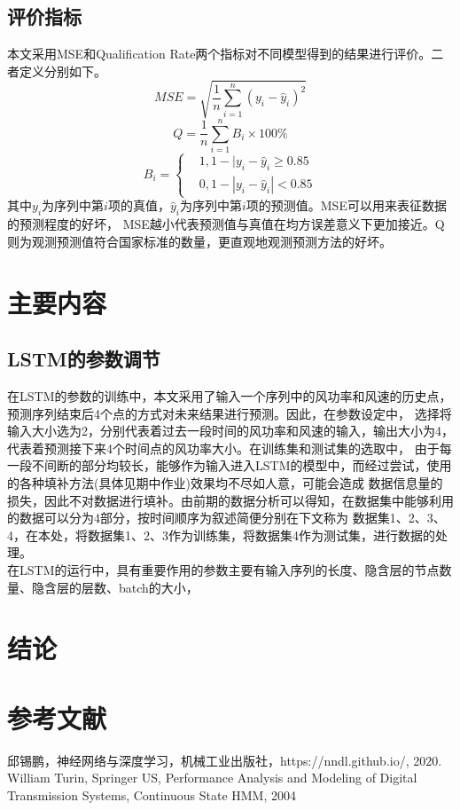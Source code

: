 \documentclass{ctexart}
\begin{document}
\subsection{评价指标}
本文采用MSE和Qualification Rate两个指标对不同模型得到的结果进行评价。二者定义分别如下。\\
\begin{equation}
    MSE = \sqrt{\frac{1}{n}\sum_{i=1}^n (y_i-\hat{y}_i)^2}
\end{equation}
\begin{equation}
    Q = \frac{1}{n}\sum_{i=1}^n B_i\times 100\%
\end{equation}
\begin{equation}
    B_i = \left\{
        \begin{aligned}
            &1, 1-|y_i-\hat{y}_i \geq 0.85\\
            &0, 1-|y_i-\hat{y}_i| < 0.85
        \end{aligned}
        \right .
\end{equation}
其中$y_i$为序列中第$i$项的真值，$\hat{y}_i$为序列中第$i$项的预测值。MSE可以用来表征数据的预测程度的好坏，
MSE越小代表预测值与真值在均方误差意义下更加接近。Q则为观测预测值符合国家标准的数量，更直观地观测预测方法的好坏。

\section{主要内容}
\subsection{LSTM的参数调节}
在LSTM的参数的训练中，本文采用了输入一个序列中的风功率和风速的历史点，预测序列结束后4个点的方式对未来结果进行预测。因此，在参数设定中，
选择将输入大小选为2，分别代表着过去一段时间的风功率和风速的输入，输出大小为4，代表着预测接下来4个时间点的风功率大小。在训练集和测试集的选取中，
由于每一段不间断的部分均较长，能够作为输入进入LSTM的模型中，而经过尝试，使用的各种填补方法(具体见期中作业)效果均不尽如人意，可能会造成
数据信息量的损失，因此不对数据进行填补。由前期的数据分析可以得知，在数据集中能够利用的数据可以分为4部分，按时间顺序为叙述简便分别在下文称为
数据集1、2、3、4，在本处，将数据集1、2、3作为训练集，将数据集4作为测试集，进行数据的处理。\\
在LSTM的运行中，具有重要作用的参数主要有输入序列的长度、隐含层的节点数量、隐含层的层数、batch的大小，

\section{结论}

\section{参考文献}
\noindent [1] 邱锡鹏，神经网络与深度学习，机械工业出版社，https://nndl.github.io/, 2020.\\
\noindent [2] William Turin, Springer US, Performance Analysis and Modeling of Digital Transmission Systems, Continuous State HMM, 2004\\
\noindent [3] 
\end{document}
